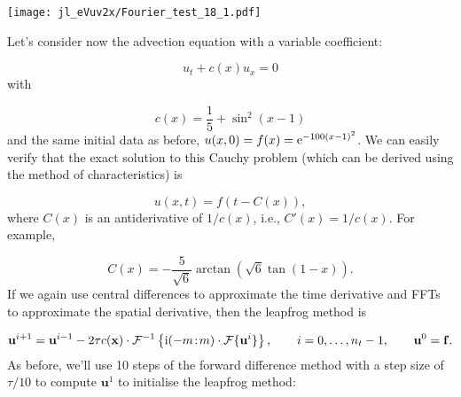 \documentclass[12pt,a4paper]{article}
\begin{document}
\texttt{[image: jl\_eVuv2x/Fourier\_test\_18\_1.pdf]}

Let's consider now the advection equation with a variable coefficient:

\[
u_t + c(x)u_x = 0
\]
with 

\[
c(x) = \frac{1}{5} + \sin^2(x-1)
\]
and the same initial data as before, $u(x,0) = f(x) = {\rm e}^{-100(x-1)^2}$.  We can easily verify that the exact solution to this Cauchy problem (which can be derived using the method of characteristics) is 

\[
u(x,t) = f\left(t - C(x)  \right),
\]
where $C(x)$ is an antiderivative of $1/c(x)$, i.e., $C'(x) = 1/c(x)$.    For example,

\[
C(x) = -\frac{5}{\sqrt{6}}\arctan \left(\sqrt{6}\tan(1-x)  \right).
\]
If we again use central differences to approximate the time derivative and FFTs to approximate the spatial derivative, then the leapfrog method is

\[
\mathbf{u}^{i+1} = \mathbf{u}^{i-1} - 2\tau c(\mathbf{x})\cdot \mathcal{F}^{-1}\left\lbrace {\rm i}(-m\!:\!m)\cdot\mathcal{F}\lbrace \mathbf{u}^{i} \rbrace\right\rbrace, \qquad i = 0, \ldots, n_t-1, \qquad \mathbf{u}^0 = \mathbf{f}.
\]
As before, we'll use 10 steps of the forward difference method with a step size of $\tau/10$ to compute $\mathbf{u}^{1}$ to initialise the leapfrog method:
\end{document}

